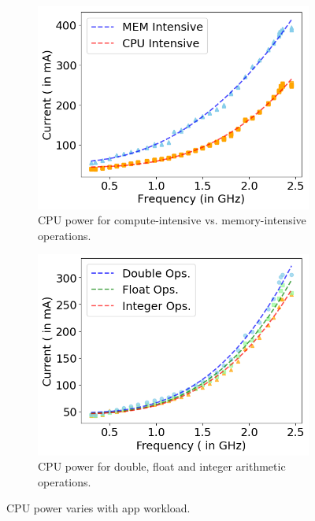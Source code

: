 \begin{figure}[tp]
    \centering
    \vspace{-0.1in}
         \begin{subfigure}[b]{0.49\columnwidth}
         \centering
    \includegraphics[width=\columnwidth]{figures/cpu_mem_characteristics.png}
    \caption{CPU power for compute-intensive vs. memory-intensive operations.}
    \label{fig:cpu_vs_mem}
\end{subfigure}
    \hfill
    \begin{subfigure}[b]{0.49\columnwidth}
         \centering
    \includegraphics[width=\columnwidth]{figures/int_float_double_characteristics.png}
    \caption{CPU power for double, float and integer arithmetic operations.} %
    \label{fig:int_vs_float_vs_double}
    \end{subfigure}
    \caption{CPU power varies with app workload.}
    \label{fig:cpu_model_derivation}
    \vspace{-0.1in}
\end{figure}

